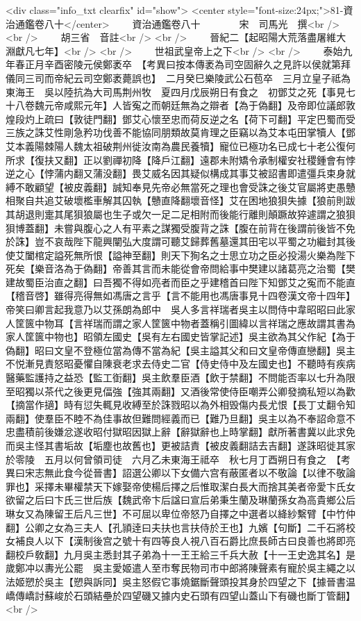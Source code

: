 <div class="info_txt clearfix" id="show">
<center style="font-size:24px;">81-資治通鑑卷八十</center>
  　　資治通鑑卷八十　　　　宋　司馬光　撰<br />
<br />
　　胡三省　音註<br />
<br />
　　晉紀二【起昭陽大荒落盡屠維大淵獻凡七年】<br />
<br />
　　世祖武皇帝上之下<br />
<br />
　　泰始九年春正月辛酉密陵元侯鄭袤卒　【考異曰按本傳袤為司空固辭久之見許以侯就第拜儀同三司而帝紀云司空鄭袤薨誤也】　二月癸巳樂陵武公石苞卒　三月立皇子祗為東海王　吳以陸抗為大司馬荆州牧　夏四月戊辰朔日有食之　初鄧艾之死【事見七十八卷魏元帝咸熙元年】人皆寃之而朝廷無為之辯者【為于偽翻】及帝即位議郎敦煌段灼上疏曰【敦徒門翻】鄧艾心懷至忠而荷反逆之名【荷下可翻】平定巴蜀而受三族之誅艾性剛急矜功伐善不能協同朋類故莫肯理之臣竊以為艾本屯田掌犢人【鄧艾本義陽棘陽人魏太祖破荆州徙汝南為農民養犢】寵位已極功名已成七十老公復何所求【復扶又翻】正以劉禪初降【降戶江翻】遠郡未附矯令承制權安社稷鍾會有悖逆之心【悖蒲内翻又蒲没翻】畏艾威名因其疑似構成其事艾被詔書即遣彊兵束身就縛不敢顧望【被皮義翻】誠知奉見先帝必無當死之理也會受誅之後艾官屬將吏愚戇相聚自共追艾破壞檻車解其囚執【戇直降翻壞音怪】艾在困地狼狽失據【狼前則跋其胡退則疐其尾狽狼屬也生子或欠一足二足相附而後能行離則顛蹶故猝遽謂之狼狽狽博蓋翻】未嘗與腹心之人有平素之謀獨受腹背之誅【腹在前背在後謂前後皆不免於誅】豈不哀哉陛下龍興闡弘大度謂可聽艾歸葬舊墓還其田宅以平蜀之功繼封其後使艾闔棺定謚死無所恨【謚神至翻】則天下狥名之士思立功之臣必投湯火樂為陛下死矣【樂音洛為于偽翻】帝善其言而未能從會帝問給事中樊建以諸葛亮之治蜀【樊建故蜀臣治直之翻】曰吾獨不得如亮者而臣之乎建稽首曰陛下知鄧艾之寃而不能直【稽音啓】雖得亮得無如馮唐之言乎【言不能用也馮唐事見十四卷漢文帝十四年】帝笑曰卿言起我意乃以艾孫朗為郎中　吳人多言祥瑞者吳主以問侍中韋昭昭曰此家人筐篋中物耳【言祥瑞而謂之家人筐篋中物者蓋稱引圖緯以言祥瑞之應故謂其書為家人筐篋中物也】昭領左國史【吳有左右國史皆掌記述】吳主欲為其父作紀【為于偽翻】昭曰文皇不登極位當為傳不當為紀【吳主謚其父和曰文皇帝傳直戀翻】吳主不悦漸見責怒昭憂懼自陳衰老求去侍史二官【侍史侍中及左國史也】不聽時有疾病醫藥監護持之益恐【監工衘翻】吳主飲羣臣酒【飲于禁翻】不問能否率以七升為限至昭獨以茶代之後更見偪強【強其兩翻】又酒後常使侍臣嘲弄公卿發摘私短以為歡【摘當作擿】時有愆失輒見收縛至於誅戮昭以為外相毁傷内長尤恨【長丁丈翻令知兩翻】使羣臣不睦不為佳事故但難問經義而已【難乃旦翻】吳主以為不奉詔命意不忠盡積前後嫌忿遂收昭付獄昭因獄上辭【辭獄辭也上時掌翻】獻所著書冀以此求免而吳主怪其書垢故【垢塵也故舊也】更被詰責【被皮義翻詰去吉翻】遂誅昭徙其家於零陵　五月以何曾領司徒　六月乙未東海王祗卒　秋七月丁酉朔日有食之　【考異曰宋志無此食今從晉書】詔選公卿以下女備六宫有蔽匿者以不敬論【以律不敬論罪也】采擇未畢權禁天下嫁娶帝使楊后擇之后惟取潔白長大而捨其美者帝愛卞氏女欲留之后曰卞氏三世后族【魏武帝卞后諡曰宣后弟秉生蘭及琳蘭孫女為高貴鄉公后琳女又為陳留王后凡三世】不可屈以卑位帝怒乃自擇之中選者以絳紗繫臂【中竹仲翻】公卿之女為三夫人【孔頴逹曰夫扶也言扶侍於王也】九嬪【句斷】二千石將校女補良人以下【漢制後宫之號十有四等良人視八百石爵比庶長師古曰良善也將即亮翻校戶敎翻】九月吳主悉封其子弟為十一王王給三千兵大赦【十一王史逸其名】是歲鄭冲以夀光公罷　吳主愛姬遣人至市奪民物司市中郎將陳聲素有寵於吳主繩之以法姬愬於吳主【愬與訴同】吳主怒假它事燒鋸斷聲頭投其身於四望之下【據晉書温嶠傳嶠討蘇峻於石頭結壘於四望磯又據内史石頭有四望山蓋山下有磯也斷丁管翻】<br />
